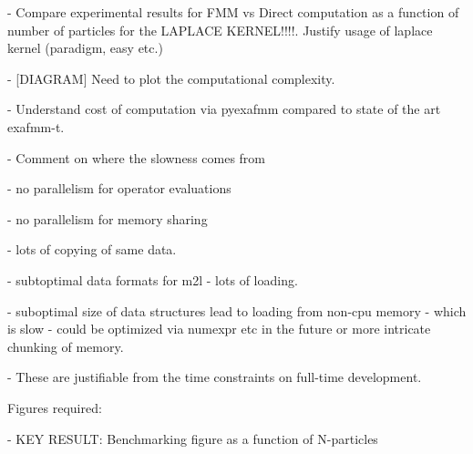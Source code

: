 - Compare experimental results for FMM vs Direct computation as a function of number of particles for the LAPLACE KERNEL!!!!. Justify usage of laplace kernel (paradigm, easy etc.)

- [DIAGRAM] Need to plot the computational complexity.

- Understand cost of computation via pyexafmm compared to state of the art exafmm-t.

- Comment on where the slowness comes from

- no parallelism for operator evaluations

- no parallelism for memory sharing

- lots of copying of same data.

- subtoptimal data formats for m2l - lots of loading.

- suboptimal size of data structures lead to loading from non-cpu memory - which is slow - could be optimized via numexpr etc in the future or more intricate chunking of memory.

- These are justifiable from the time constraints on full-time development.

Figures required:

- KEY RESULT: Benchmarking figure as a function of N-particles
